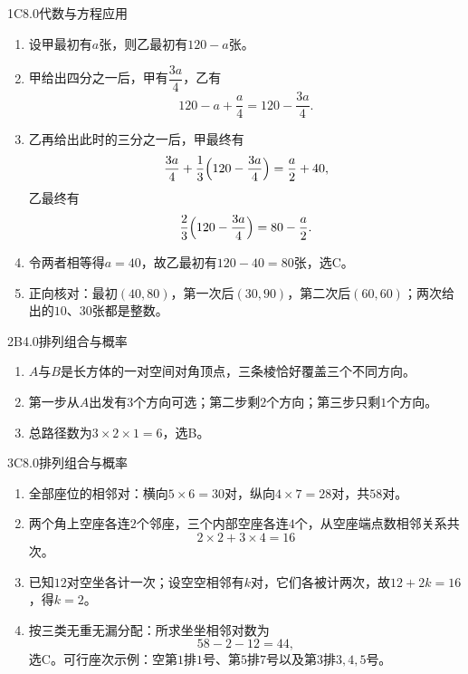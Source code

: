 

\begin{solution}{1}{C}{8.0}{代数与方程应用}
\begin{enumerate}[label=\textbf{Step \arabic*:},leftmargin=*]
  \item 设甲最初有\(a\)张，则乙最初有\(120-a\)张。
  \item 甲给出四分之一后，甲有\(\dfrac{3a}{4}\)，乙有
  \[
    120-a+\dfrac{a}{4}=120-\dfrac{3a}{4}.
  \]
  \item 乙再给出此时的三分之一后，甲最终有
  \[
    \dfrac{3a}{4}+\dfrac{1}{3}\Bigl(120-\dfrac{3a}{4}\Bigr)=\dfrac{a}{2}+40,
  \]
  乙最终有
  \[
    \dfrac{2}{3}\Bigl(120-\dfrac{3a}{4}\Bigr)=80-\dfrac{a}{2}.
  \]
  \item 令两者相等得\(a=40\)，故乙最初有\(120-40=80\)张，选C。
  \item 正向核对：最初\((40,80)\)，第一次后\((30,90)\)，第二次后\((60,60)\)；两次给出的\(10\)、\(30\)张都是整数。
\end{enumerate}
\end{solution}

\begin{solution}{2}{B}{4.0}{排列组合与概率}
\begin{enumerate}[label=\textbf{Step \arabic*:},leftmargin=*]
  \item \(A\)与\(B\)是长方体的一对空间对角顶点，三条棱恰好覆盖三个不同方向。
  \item 第一步从\(A\)出发有\(3\)个方向可选；第二步剩\(2\)个方向；第三步只剩\(1\)个方向。
  \item 总路径数为\(3\times2\times1=6\)，选B。
\end{enumerate}
\end{solution}

\begin{solution}{3}{C}{8.0}{排列组合与概率}
\begin{enumerate}[label=\textbf{Step \arabic*:},leftmargin=*]
  \item 全部座位的相邻对：横向\(5\times6=30\)对，纵向\(4\times7=28\)对，共\(58\)对。
  \item 两个角上空座各连\(2\)个邻座，三个内部空座各连\(4\)个，从空座端点数相邻关系共
  \[
    2\times2+3\times4=16
  \]
  次。
  \item 已知\(12\)对空坐各计一次；设空空相邻有\(k\)对，它们各被计两次，故\(12+2k=16\)，得\(k=2\)。
  \item 按三类无重无漏分配：所求坐坐相邻对数为
  \[
    58-2-12=44,
  \]
  选C。可行座次示例：空第\(1\)排\(1\)号、第\(5\)排\(7\)号以及第\(3\)排\(3,4,5\)号。
\end{enumerate}
\end{solution}

